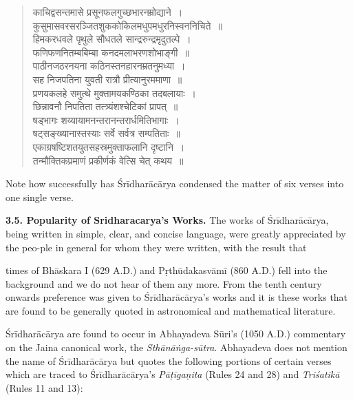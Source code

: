 \documentclass[10pt, openany]{book}
\begin{document}
\begin{quote}
{\qt काचिद्वसन्तमासे प्रसूनफलगुच्छभारनम्रोद्याने~। \\
 कुसुमासवरसरञ्जितशुककोकिलमधुपमधुरनिस्वननिचिते~॥ \\
 हिमकरधवले पृथुले सौधतले सान्द्ररुन्द्रमृदुतल्पे~। \\
 फणिफणनितम्बबिम्बा कनदमलाभरणशोभाङ्गी~॥ \\
 पाठीनजठरनयना कठिनस्तनहारनम्रतनुमध्या~। \\
 सह निजपतिना युवती रात्रौ प्रीत्यानुरममाणा~॥ \\
 प्रणयकलहे समुत्थे मुक्तामयकण्ठिका तदबलायाः~। \\
 छिन्नावनौ निपतिता तत्त्र्यंशश्चेटिकां प्रापत्~॥ \\
 षड्भागः शय्यायामनन्तरानन्तरार्धमितिभागाः~। \\
 षट्सङ्ख्यानास्तस्याः सर्वे सर्वत्र सम्पतिताः~॥ \\
 एकाग्रषष्टिशतयुतसहस्रमुक्ताफलानि दृष्टानि~। \\ 
 तन्मौक्तिकप्रमाणं प्रकीर्णकं वेत्सि चेत् कथय~॥} 
\end{quote}
\vspace{-4mm}

\hfill {}
\vspace{3mm}

{Note how successfully has Śrīdharācārya condensed the}
{matter of six verses into one single verse.}
\vspace{3mm}

{\textbf{3.5. Popularity of Sridharacarya's Works.} The}
{works of Śrīdharācārya, being written in simple, clear,}
{and concise language, were greatly appreciated by the peo-ple}
{in general for whom they were written, with the result that}

\newpage

\englishfont{}
{times of Bhāskara I (629 A.D.) and Pṛthūdakasvāmī (860 A.D.)}
{fell into the background and we do not hear of them any}
{more. From the tenth century onwards preference was} 
{given to Śrīdharācārya's works and it is these works that are}
{found to be generally quoted in astronomical and mathematical literature.}

\vspace{0.3cm}{The earliest known quotations from the writings of} 
{Śrīdharācārya are found to occur in Abhayadeva Sūri's}
{(1050 A.D.) commentary on the Jaina canonical work, the}
{\textit{Sthānāṅga-sūtra}. Abhayadeva does not mention the name of}
{Śrīdharācārya but quotes the following portions of certain}
{verses which are traced to Śrīdharācārya's \textit{Pāṭīgaṇita}
(Rules}
{24 and 28) and \textit{Triśatikā }(Rules 11 and 13):}
\vspace{2mm}
\end{document}
